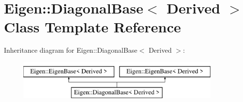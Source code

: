 \hypertarget{class_eigen_1_1_diagonal_base}{}\section{Eigen\+:\+:Diagonal\+Base$<$ Derived $>$ Class Template Reference}
\label{class_eigen_1_1_diagonal_base}
Inheritance diagram for Eigen\+:\+:Diagonal\+Base$<$ Derived $>$\+:\begin{figure}[H]
\begin{center}
\leavevmode
\includegraphics[height=2.000000cm]{class_eigen_1_1_diagonal_base}
\end{center}
\end{figure}
